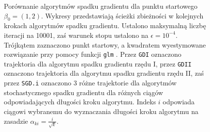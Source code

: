 \begin{figure}[hbt!]
  \caption[Porównanie algorytmów spadku gradientu dla punktu startowego $\beta_0 = (1,2)$.]{\label{fig:sc2asd}Porównanie algorytmów spadku gradientu dla punktu startowego $\beta_0 = (1,2)$. Wykresy przedstawiają ścieżki zbieżności w kolejnych krokach algorytmów spadku gradientu. Ustalono maksymalną liczbę iteracji na 10001, zaś warunek stopu ustalono na $\epsilon=10^{-4}$. Trójkątem zaznaczono punkt startowy, a kwadratem wyestymowane rozwiązanie przy pomocy funkcji \texttt{glm} \cite{glmglm}. Przez \texttt{GDI} oznaczono trajektoria dla algorytmu spadku gradientu rzędu I, przez \texttt{GDII} oznaczono trajektoria dla algorytmu spadku gradientu rzędu II, zaś przez \texttt{SGD.i} oznaczono 3 różne trajektorie dla algorytmów stochastycznego spadku gradientu dla różnych ciągów odpowiadających długości kroku algorytmu. Indeks $i$ odpowiada ciągowi wybranemu do wyznaczania długości kroku algorytmu na zasadzie $\alpha_{ki} = \frac{i}{\sqrt{k}}$.}
\end{figure}


